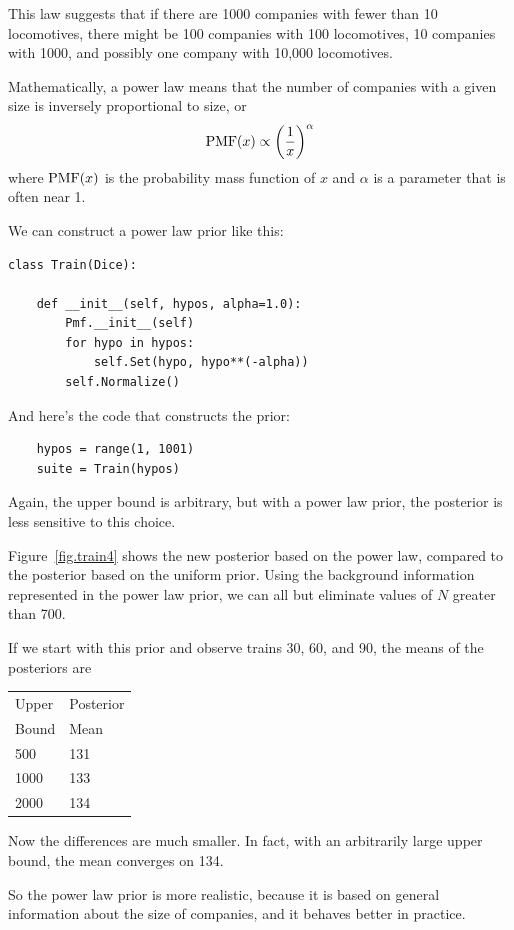 \documentclass[12pt]{book}
\begin{document}
This law suggests that if there are 1000 companies with fewer than
10 locomotives, there might be 100 companies with 100 locomotives,
10 companies with 1000, and possibly one company with 10,000 locomotives.

Mathematically, a power law means that the number of companies
with a given size is inversely proportional to size, or
%
\[ \mathrm{PMF}(x) \propto \left( \frac{1}{x} \right)^{\alpha}   \]
%
where $\mathrm{PMF}(x)$ is the probability mass function of $x$ and $\alpha$ is
a parameter that is often near 1.

We can construct a power law prior like this:

\begin{verbatim}
class Train(Dice):

    def __init__(self, hypos, alpha=1.0):
        Pmf.__init__(self)
        for hypo in hypos:
            self.Set(hypo, hypo**(-alpha))
        self.Normalize()
\end{verbatim}

And here's the code that constructs the prior:

\begin{verbatim}
    hypos = range(1, 1001)
    suite = Train(hypos)
\end{verbatim}

Again, the upper bound is arbitrary, but with a power law
prior, the posterior is less sensitive to this choice.

Figure~\ref{fig.train4} shows the new posterior based on
the power law, compared to the posterior based on the
uniform prior.  Using the background information
represented in the power law prior, we can all but eliminate
values of $N$ greater than 700.

If we start with this prior and observe trains 30, 60, and 90,
the means of the posteriors are

  \begin{tabular}{|l|l|}
  \hline
  Upper & Posterior \\
  Bound & Mean \\
  \hline
  500 & 131 \\
  1000 & 133 \\
  2000 & 134 \\
  \hline
  \end{tabular}

Now the differences are much smaller.  In fact,
with an arbitrarily large upper bound, the mean converges on 134.

So the power law prior is more realistic, because it is based on
general information about the size of companies, and it
behaves better in practice.
\end{document}
